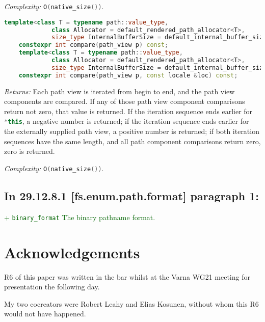 \documentclass[11pt]{article}
\newcommand{\code}[2][cpp]{\lstinline[language=#1,basicstyle=\small\ttfamily]{#2}}
\newcommand{\desc}[1]{\textit{#1}}
\newcommand{\returns}{\desc{Returns: }}
\newcommand{\complexity}{\desc{Complexity: }}
\newcommand{\tsrefp}[3]{\subsection*{In #2 \textbf{[#1]} paragraph #3:}}
\newcommand{\tsreplace}[3]{\textcolor{red}{\sout{#1}}#2\textcolor{darkgreen}{#3}}
\begin{document}
\complexity \code{O(native_size())}.\\

\begin{lstlisting}[language=cpp]
    template<class T = typename path::value_type,
             class Allocator = default_rendered_path_allocator<T>,
             size_type InternalBufferSize = default_internal_buffer_size>
    constexpr int compare(path_view p) const;
    template<class T = typename path::value_type,
             class Allocator = default_rendered_path_allocator<T>,
             size_type InternalBufferSize = default_internal_buffer_size>
    constexpr int compare(path_view p, const locale &loc) const;
\end{lstlisting}

\returns Each path view is iterated from begin to end, and the path view components are compared. If any of those path view component comparisons return not zero, that value is returned. If the iteration sequence ends earlier for \code{*this}, a negative number is returned; if the iteration sequence ends earlier for the externally supplied path view, a positive number is returned; if both iteration sequences have the same length, and all path component comparisons return zero, zero is returned.

\complexity \code{O(native_size())}.\\

\tsrefp{fs.enum.path.format}{29.12.8.1}{1}

\tsreplace{}{}{+ \code{binary_format} The binary pathname format.}

\color{black}

\section{Acknowledgements}

R6 of this paper was written in the bar whilst at the Varna WG21 meeting
for presentation the following day.

My two cocreators were Robert Leahy and Elias Kosunen, without whom this
R6 would not have happened.
\end{document}

